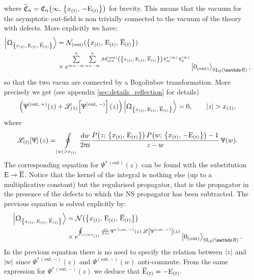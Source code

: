 where $\tffC_n = \cmode{n}{\infty}{-\rE_{(t)}}{x_{(t)}}$ for brevity.
This means that the vacuum for the asymptotic out-field is non trivially connected to the vacuum of the theory with defects.
More explicitly we have:
\begin{equation}
  \begin{split}
    \Gexcvacket
    & =
    \cN_{(\text{out})}(\qty{x_{(t)},\, \rE_{(t)},\, \brE_{(t)}})
    \\
    & \times
    e^{%
      \infzerosum{m} \infzerosum{n}
      \cM_{m n}^{(\text{out})}\qty(\qty{x_{(t)},\, \rE_{(t)},\, \brE_{(t)}})\,
      b^{*\, ( \infty )}_{m}\, b^{( \infty )}_{n}
    }
    \regvacuumout,
  \end{split}
\end{equation}
so that the two  vacua are connected by a Bogoliubov transformation.
More precisely we get (see appendix \ref{sec:details_reflection} for details)
\begin{equation}
  \qty(%
    \Psi^{(\text{out},\, +)}( z )
    +
    \ccL_{(1)}\qty[\Psi^{(\text{out},\, -)}]( z )
  )
  \Gexcvacket
  =
  0,
  \qquad
  \abs{z} > x_{(1)},
  \label{eq:reflection condition_out_field_generic_vacuum}
\end{equation}
where
\begin{equation}
  \ccL_{(t)}\qty[\Psi]( z )
  =
  \oint\limits_{\abs{w} > x_{(t)}} \ddw
  \frac{P\qty( z;\, \qty{x_{(t)},\, \rE_{(t)}} )\, P\qty( w;\, \qty{x_{(t)},\, -\rE_{(t)}} ) - 1}{z - w}\,
  \Psi( w ).
\end{equation}
The corresponding equation for $\Psi^{*\, (\text{out})}( z )$ can be found with the substitution $\mathrm{E}  \rightarrow \overline{\mathrm{E}}$.
Notice that the kernel of the integral is nothing else (up to a multiplicative constant) but the regularised propagator, that is the propagator in the presence of the defects to which the NS propagator has been subtracted. 
The previous equation is solved explicitly by:
\begin{equation}
  \begin{split}
    \Gexcvacket
    & =
    \cN\qty(\qty{x_{(t)},\, \rE_{(t)},\, \brE_{(t)}})~
    \\
    & \times
    e^{%
      \oint_{\abs{z} > x_{(1)}} \ddz
      \Psi^{*\, (\text{out},\, -)}( z )\,
      \ccL\qty[ \Psi^{(\text{out},\, -)} ]( z )
    }
    \regvacuumout.
  \end{split}
\end{equation}
In the previous equation there is no need to specify the relation between $\abs{z}$ and $\abs{w}$ since $\Psi^{*\, (\text{out}, -)}( z )$ and $\Psi^{(\text{out}, -)}( w )$ anti-commute.
From the same expression for $\Psi^{*\, (\text{out}, -)}( z )$ we deduce that $\overline{\mathrm{E}}_{(t)} = -\mathrm{E}_{(t)}$.



